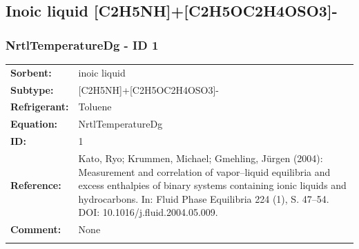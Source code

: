 \subsection{Inoic liquid [C2H5NH]+[C2H5OC2H4OSO3]-}
%
\subsubsection{NrtlTemperatureDg - ID 1}
%
\begin{tabular}[l]{|lp{11.5cm}|}
\hline
\addlinespace

\textbf{Sorbent:} & inoic liquid \\
\textbf{Subtype:} & [C2H5NH]+[C2H5OC2H4OSO3]- \\
\textbf{Refrigerant:} & Toluene \\
\textbf{Equation:} & NrtlTemperatureDg \\
\textbf{ID:} & 1 \\
\textbf{Reference:} & Kato, Ryo; Krummen, Michael; Gmehling, Jürgen (2004): Measurement and correlation of vapor–liquid equilibria and excess enthalpies of binary systems containing ionic liquids and hydrocarbons. In: Fluid Phase Equilibria 224 (1), S. 47–54. DOI: 10.1016/j.fluid.2004.05.009. \\
\textbf{Comment:} & None \\

\addlinespace
\hline
\end{tabular}
\newline

